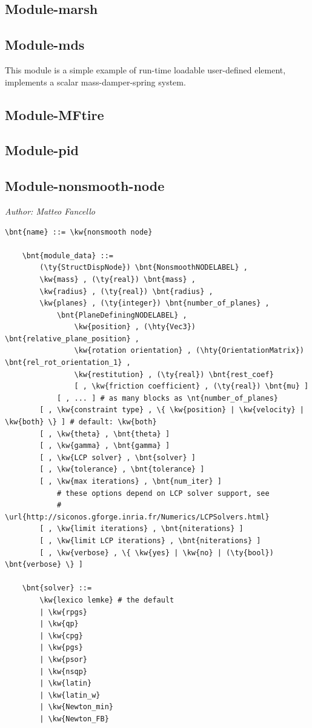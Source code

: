 \subsection{Module-marsh}
\label{sec:MODULES:MARSH}


\subsection{Module-mds}
This module is a simple example of run-time loadable user-defined element,
implements a scalar mass-damper-spring system.

\subsection{Module-MFtire}


\subsection{Module-pid}





\subsection{Module-nonsmooth-node}
\emph{Author: Matteo Fancello}
\begin{Verbatim}[commandchars=\\\{\}]
    \bnt{name} ::= \kw{nonsmooth node}

    \bnt{module_data} ::=
        (\ty{StructDispNode}) \bnt{NonsmoothNODELABEL} ,
        \kw{mass} , (\ty{real}) \bnt{mass} ,
        \kw{radius} , (\ty{real}) \bnt{radius} ,
        \kw{planes} , (\ty{integer}) \bnt{number_of_planes} ,
            \bnt{PlaneDefiningNODELABEL} ,
                \kw{position} , (\hty{Vec3}) \bnt{relative_plane_position} ,
                \kw{rotation orientation} , (\hty{OrientationMatrix}) \bnt{rel_rot_orientation_1} ,
                \kw{restitution} , (\ty{real}) \bnt{rest_coef}
                [ , \kw{friction coefficient} , (\ty{real}) \bnt{mu} ] 
            [ , ... ] # as many blocks as \nt{number_of_planes}
        [ , \kw{constraint type} , \{ \kw{position} | \kw{velocity} | \kw{both} \} ] # default: \kw{both}
        [ , \kw{theta} , \bnt{theta} ]
        [ , \kw{gamma} , \bnt{gamma} ]
        [ , \kw{LCP solver} , \bnt{solver} ]
        [ , \kw{tolerance} , \bnt{tolerance} ]
        [ , \kw{max iterations} , \bnt{num_iter} ]
            # these options depend on LCP solver support, see
            # \url{http://siconos.gforge.inria.fr/Numerics/LCPSolvers.html}
        [ , \kw{limit iterations} , \bnt{niterations} ]
        [ , \kw{limit LCP iterations} , \bnt{niterations} ]
        [ , \kw{verbose} , \{ \kw{yes} | \kw{no} | (\ty{bool}) \bnt{verbose} \} ]

    \bnt{solver} ::=
        \kw{lexico lemke} # the default
        | \kw{rpgs}
        | \kw{qp}
        | \kw{cpg}
        | \kw{pgs}
        | \kw{psor}
        | \kw{nsqp}
        | \kw{latin}
        | \kw{latin_w}
        | \kw{Newton_min}
        | \kw{Newton_FB}
\end{Verbatim}

